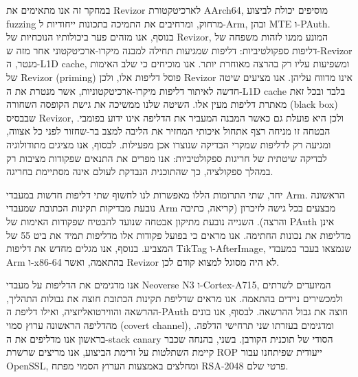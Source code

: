 {במחקר זה אנו מתאימים את \textenglish{Revizor} לארכיטקטורת \textenglish{AArch64}, מוסיפים יכולת לביצוע \textenglish{fuzzing} מרחוק, ומרחיבים את התמיכה בתכונות ייחודיות ל-\textenglish{Arm}, ובהן \textenglish{MTE} ו-\textenglish{PAuth}. בנוסף, אנו מזהים פער ביכולותיו הנוכחיות של \textenglish{Revizor}, המונע ממנו לזהות משפחה של דליפות ספקולטיביות: דליפות שמגיעות תחילה למבנה מיקרו-ארכיטקטוני אחר מזה ש-\textenglish{Revizor} מנטר, ה-\textenglish{L1D cache}, ומשפיעות עליו רק בהרצה מאוחרת יותר. אנו מוכיחים כי שלב האימות של \textenglish{Revizor} \textenglish{(priming)} פוסל דליפות אלו, ולכן \textenglish{Revizor} אינו מדווח עליהן. אנו מציעים שיטה חדשה לאיתור דליפות מיקרו-ארכיטקטוניות, אשר מנטרת את ה-\textenglish{L1D cache} בלבד ובכל זאת מאתרת דליפות מעין אלו. השיטה שלנו ממשיכה את גישת הקופסה השחורה \textenglish{(black box)} שבבסיס \textenglish{Revizor}, ולכן היא פועלת גם כאשר המבנה המעביר את הדליפה אינו ידוע בפומבי. הבטחה זו מניחה רצף אתחול איכותי המחזיר את הליבה למצב בר-שחזור לפני כל אצווה, ומגיעה רק לדליפות שמקרי הבדיקה שנוצרו אכן מפעילות. לבסוף, אנו מציגים מתודולוגיה לבדיקה שיטתית של חריגות ספקולטיביות: אנו מפרים את התנאים שפקודות מציבות רק במהלך ספקולציה, כך שהתוכנית הנבדקת לעולם אינה מסתיימת בחריגה.

יחד, שתי התרומות הללו מאפשרות לנו לחשוף שתי דליפות חדשות במעבדי \textenglish{Arm}. הראשונה נובעת מבדיקות תקינות הכתובת שמעבדי \textenglish{Arm} מבצעים בכל גישה לזיכרון (קריאה, כתיבה והרצה). השנייה נובעת מתיקון אבטחה שנועד להבטיח שפקודות האימות של \textenglish{PAuth} אינן מדליפות את נכונות החתימה. אנו מראים כי בפועל פקודות אלו מדליפות תמיד את ביט 55 של המצביע. בנוסף, אנו מגלים מחדש את דליפות \textenglish{TikTag} ו-\textenglish{AfterImage}, שנמצאו בעבר במעבדי \textenglish{Arm} ו-\textenglish{x86-64} בהתאמה, ואשר \textenglish{Revizor} לא היה מסוגל למצוא קודם לכן.

אנו מדגימים את הדליפות על מעבדי \textenglish{Neoverse N3} ו-\textenglish{Cortex-A715}, המיועדים לשרתים ולמכשירים ניידים בהתאמה. אנו מראים שדליפת תקינות הכתובת חוצה את גבולות התהליך, ההרשאה והווירטואליזציה, ואילו דליפת ה-\textenglish{PAuth} חוצה את גבול ההרשאה. לבסוף, אנו בונים מהדליפה הראשונה ערוץ סמוי \textenglish{(covert channel)}, ומדגימים בעזרתו שני תרחישי הדלפה. בראשון אנו מדליפים את ה-\textenglish{stack canary} הסודי של תוכנית הקורבן. בשני, בהנחה שכבר קיימת השתלטות על זרימת הביצוע, אנו מריצים שרשרת \textenglish{ROP} ייעודית שפיתחנו עבור \textenglish{OpenSSL}, ומחלצים באמצעות הערוץ הסמוי מפתח \textenglish{RSA-2048} פרטי שלם.

} %

